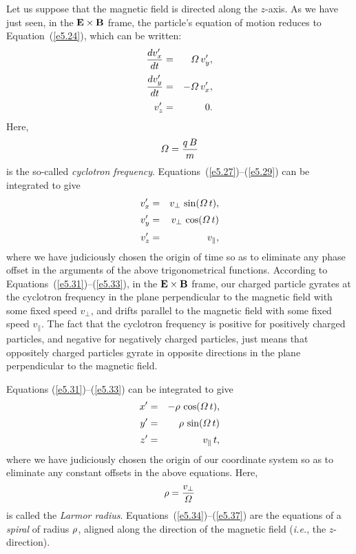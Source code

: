 Let us suppose that the magnetic field is directed along the $z$-axis. 
As we have just seen, in the ${\bf E}\times{\bf B}$ frame, the particle's equation of motion reduces to Equation~(\ref{e5.24}), which can be written:
\begin{eqnarray}\label{e5.27}
\frac{d v_x'}{dt} &=& {\mit\Omega}\,v_y',\\[0.5ex]
\frac{d v_y'}{dt} &=& -{\mit\Omega}\,v_x',\\[0.5ex]
v_z' &=& 0.\label{e5.29}
\end{eqnarray}
Here,
\begin{equation}
{\mit\Omega} = \frac{q\,B}{m}
\end{equation}
is the so-called {\em cyclotron frequency}.
Equations~(\ref{e5.27})--(\ref{e5.29}) can be integrated to give
\begin{eqnarray}\label{e5.31}
v_x'&=& v_\perp\,\sin({\mit\Omega}\,t),\\[0.5ex]
v_y'&=&v_\perp\,\cos({\mit\Omega}\,t)\\[0.5ex]
v_z' &=& v_\parallel,\label{e5.33}
\end{eqnarray}
where we have judiciously chosen the origin of time so as to eliminate
any phase offset in the arguments of the above trigonometrical functions.
According to Equations~(\ref{e5.31})--(\ref{e5.33}), in the ${\bf E}\times {\bf B}$
frame, our charged particle gyrates at the cyclotron frequency in the plane perpendicular to the
magnetic field with some fixed speed $v_\perp$, and drifts parallel to the magnetic
field with  some  fixed speed $v_\parallel$. 
The fact that the cyclotron frequency is positive for positively charged
particles, and negative for negatively charged particles, just means that
oppositely charged particles gyrate in opposite directions in the
plane perpendicular to the magnetic field.

Equations (\ref{e5.31})--(\ref{e5.33}) can be integrated to give
\begin{eqnarray}\label{e5.34}
x'&=& -{\mit\rho}\,\cos({\mit\Omega}\,t),\\[0.5ex]
y'&=&{\mit\rho}\,\sin({\mit\Omega}\,t)\\[0.5ex]
z' &=& v_\parallel\,t,\label{e5.37}
\end{eqnarray}
where we have  judiciously chosen the origin of our coordinate system so
as to eliminate any constant offsets in the above equations.
Here,
\begin{equation}
{\bf \rho} = \frac{v_\perp}{{\mit\Omega}}
\end{equation}
is called the {\em Larmor radius}. Equations~(\ref{e5.34})--(\ref{e5.37})
are the equations of a {\em spiral}\/ of radius ${\mit\rho}$, aligned along the direction
of the magnetic field ({\em i.e.}, the $z$-direction).

